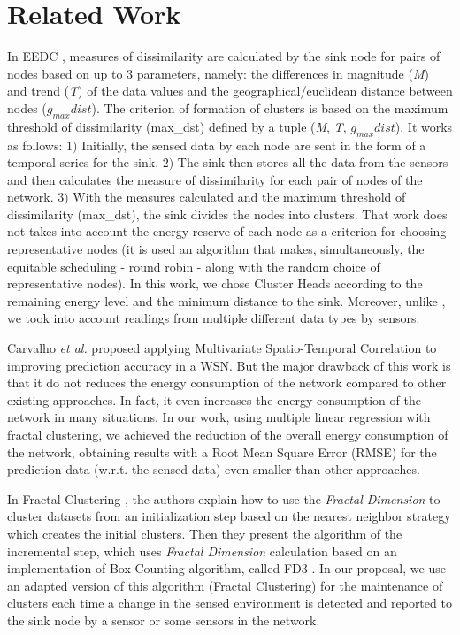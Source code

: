 \documentclass{acm_proc_article-sp}
\begin{document}
\section{Related Work}
\label{related-work}

In EEDC \cite{Liu2007}, measures of dissimilarity are calculated by the sink
node for pairs of nodes based on up to $3$ parameters, namely:
the differences in magnitude (\textit{M}) and trend (\textit{T}) of the data
values and the geographical/euclidean distance between nodes ($g_{max}dist$).
The criterion of formation of clusters is based on the maximum threshold of
dissimilarity (max\_dst) defined by a tuple (\textit{M}, \textit{T},
$g_{max}dist$). It works as follows: $1)$ Initially, the sensed data by each
node are sent in the form of a temporal series for the sink. $2)$ The sink then
stores all the data from the sensors and then calculates the measure of
dissimilarity for each pair of nodes of the network. $3)$
With the measures calculated and the maximum threshold of dissimilarity
(max\_dst), the sink divides the nodes into clusters.
That work does not takes into account the energy reserve of each node as a
criterion for choosing representative nodes (it is used an algorithm that makes,
simultaneously, the equitable scheduling - round robin - along with the random
choice of representative nodes). In this work, we chose Cluster Heads according
to the remaining energy level and the minimum distance to the sink. Moreover,
unlike \cite{Liu2007}, we took into account readings from multiple different
data types by sensors.
\vspace*{-.3cm}

Carvalho \textit{et al.} \cite{Carvalho2011} proposed applying Multivariate
Spatio-Temporal Correlation to improving prediction accuracy in a WSN. But the
major drawback of this work is that it do not reduces the energy consumption of
the network compared to other existing approaches. In fact, it even increases
the energy consumption of the network in many situations. In our work, using
multiple linear regression with fractal clustering, we achieved the reduction of
the overall energy consumption of the network, obtaining results with a Root
Mean Square Error (RMSE) for the prediction data (w.r.t. the sensed data) even
smaller than other approaches.
\vspace*{-.3cm}

In Fractal Clustering \cite{Barbara2000}, the authors explain how to use the
\textit{Fractal Dimension} to cluster datasets from an initialization step
based on the nearest neighbor strategy which creates the initial clusters. Then
they present the algorithm of the incremental step, which uses \textit{Fractal
Dimension} calculation based on an implementation of Box Counting algorithm,
called FD3 \cite{Liebovitch1989}. In our proposal, we use an adapted version of
this algorithm (Fractal Clustering) for the maintenance of clusters each time a
change in the sensed environment is detected and reported to the sink node by
a sensor or some sensors in the network.
\end{document}
